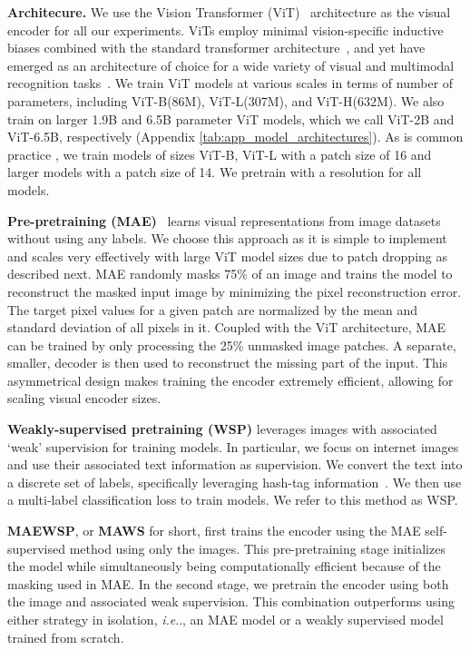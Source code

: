 \documentclass[10pt,twocolumn,letterpaper]{article}
\makeatletter
\DeclareRobustCommand\onedot{\futurelet\@let@token\@onedot}
\def\@onedot{\ifx\@let@token.\else.\null\fi\xspace}
\def\ie{\emph{i.e}\onedot} \def\Ie{\emph{I.e}\onedot}
\newcommand{\mae}{MAE\xspace}
\newcommand{\ce}{WSP\xspace}
\newcommand{\ours}{MAEWSP\xspace}  \newcommand{\oursig}{\ours{}\textsubscript{IG}\xspace}
\newcommand{\vit}{ViT\xspace}
\newcommand{\vitB}{ViT-B\xspace}
\newcommand{\vitL}{ViT-L\xspace}
\newcommand{\vitH}{ViT-H\xspace}
\newcommand{\vitTwoB}{ViT-2B\xspace}
\newcommand{\vitSixB}{ViT-6.5B\xspace}
\makeatother
\begin{document}
\par \noindent \textbf{Architecure.}
We use the Vision Transformer (\vit)~\cite{dosovitskiy2020image} architecture as the visual encoder for all our experiments.
ViTs employ minimal vision-specific inductive biases combined with the standard transformer architecture~\cite{vaswani2017attention}, and yet have emerged as an architecture of choice for a wide variety of visual and multimodal recognition tasks~\cite{zhai2022scaling,arnab2021vivit,girdhar2023omnimae}.
We train \vit models
at various scales in terms of number of parameters, including \vitB (86M), \vitL (307M), and \vitH (632M). We also train on larger 1.9B and 6.5B parameter \vit models, which
we call \vitTwoB and \vitSixB, respectively (Appendix \cref{tab:app_model_architectures}).
As is common practice \cite{dosovitskiy2020image,zhai2022scaling}, we train models of sizes \vitB, \vitL with a patch size
of 16 and larger models with a patch size of 14. We pretrain with a  resolution for all models. 

\par \noindent \textbf{Pre-pretraining (\mae)}~\cite{he2021masked} learns visual representations from image datasets without using any labels. We choose this approach as it is simple to implement and scales very effectively with large \vit model sizes due to patch dropping as described next. \mae randomly masks 75\% of an image and trains the model to reconstruct the masked input image by minimizing the pixel reconstruction error.
The target pixel values for a given patch are normalized by the mean and standard deviation of all pixels in it.
Coupled with the \vit architecture, \mae can be trained by only processing the 25\% unmasked image patches.
A separate, smaller, decoder is then used to reconstruct the missing part of the input.
This asymmetrical design makes training the encoder extremely efficient, allowing for scaling visual encoder sizes.


\par \noindent \textbf{Weakly-supervised pretraining (\ce)} leverages images with associated `weak' supervision for training models.
In particular, we focus on internet images and use their associated text information as supervision.
We convert the text into a discrete set of labels, specifically leveraging hash-tag information~\cite{mahajan2018exploring,singh2022revisiting,ghadiyaram2019large}.
We then use a multi-label classification loss to train models.
We refer to this method as \ce. 


\par \noindent \textbf{\ours}, or \textbf{MAWS} for short,
first trains the encoder using the \mae self-supervised method using only the images. This pre-pretraining stage initializes the model while simultaneously being computationally efficient because of the masking used in \mae.
In the second stage, we pretrain the encoder using both the image and associated weak supervision. This combination outperforms using either strategy in isolation, \ie, an \mae model or a weakly supervised model trained from scratch.
\end{document}
